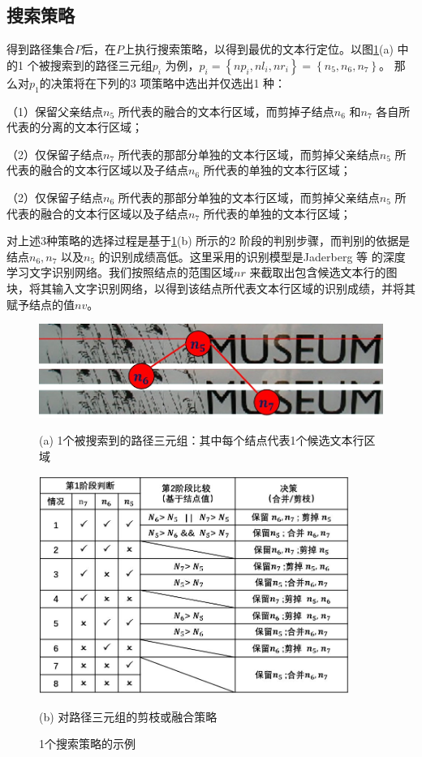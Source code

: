         \subsection{搜索策略}
        \label{sec.c4_searching strategies}

        得到路径集合$P$后，在$P$上执行搜索策略，以得到最优的文本行定位。以图\ref{fig.c4_search_strategy}(a) 中的1 个被搜索到的路径三元组$p_i$ 为例，$p_i=\left\{np_i,nl_i,nr_i\right\}=\left\{n_5,n_6,n_7\right\}$。 那么对$p_1$的决策将在下列的3 项策略中选出并仅选出1 种：

        （1）保留父亲结点$n_5$ 所代表的融合的文本行区域，而剪掉子结点$n_6$ 和$n_7$ 各自所代表的分离的文本行区域；

        （2）仅保留子结点$n_7$ 所代表的那部分单独的文本行区域，而剪掉父亲结点$n_5$ 所代表的融合的文本行区域以及子结点$n_6$ 所代表的单独的文本行区域；

        （2）仅保留子结点$n_6$ 所代表的那部分单独的文本行区域，而剪掉父亲结点$n_5$ 所代表的融合的文本行区域以及子结点$n_7$ 所代表的单独的文本行区域；

        对上述3种策略的选择过程是基于\ref{fig.c4_search_strategy}(b) 所示的2 阶段的判别步骤，而判别的依据是结点$n_6,n_7$ 以及$n_5$ 的识别成绩高低。这里采用的识别模型是Jaderberg 等\cite{Jaderberg2016Reading} 的深度学习文字识别网络。我们按照结点的范围区域$nr$ 来截取出包含候选文本行的图块，将其输入文字识别网络，以得到该结点所代表文本行区域的识别成绩，并将其赋予结点的值$nv$。

        \begin{figure}[!h]
        \centering
        \includegraphics[width=\textwidth]{./figures/c4_search_strategy1.jpg}
        \centerline{\small (a) 1个被搜索到的路径三元组：其中每个结点代表1个候选文本行区域 }
        \includegraphics[width=0.9\textwidth]{./figures/c4_search_strategy2.jpg}
        \centerline{\small (b) 对路径三元组的剪枝或融合策略}
        \caption{ 1个搜索策略的示例}
        \label{fig.c4_search_strategy}
        \end{figure}

